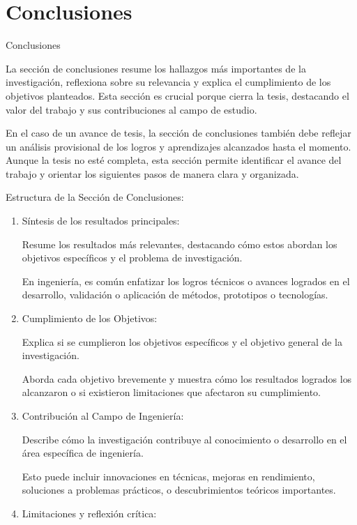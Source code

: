 \documentclass[9pt]{beamer}
\begin{document}
\section{Conclusiones}
\begin{frame}{Conclusiones}

La sección de conclusiones resume los hallazgos más importantes de la investigación, reflexiona sobre su relevancia y explica el cumplimiento de los objetivos planteados. Esta sección es crucial porque cierra la tesis, destacando el valor del trabajo y sus contribuciones al campo de estudio.

En el caso de un avance de tesis, la sección de conclusiones también debe reflejar un análisis provisional de los logros y aprendizajes alcanzados hasta el momento. Aunque la tesis no esté completa, esta sección permite identificar el avance del trabajo y orientar los siguientes pasos de manera clara y organizada.


Estructura de la Sección de Conclusiones:

\begin{enumerate}
    \item Síntesis de los resultados principales:

    Resume los resultados más relevantes, destacando cómo estos abordan los objetivos específicos y el problema de investigación.

    En ingeniería, es común enfatizar los logros técnicos o avances logrados en el desarrollo, validación o aplicación de métodos, prototipos o tecnologías.

    \item Cumplimiento de los Objetivos:

    Explica si se cumplieron los objetivos específicos y el objetivo general de la investigación.

    Aborda cada objetivo brevemente y muestra cómo los resultados logrados los alcanzaron o si existieron limitaciones que afectaron su cumplimiento.

    \item Contribución al Campo de Ingeniería:

    Describe cómo la investigación contribuye al conocimiento o desarrollo en el área específica de ingeniería.

    Esto puede incluir innovaciones en técnicas, mejoras en rendimiento, soluciones a problemas prácticos, o descubrimientos teóricos importantes.

    \item Limitaciones y reflexión crítica:


\end{enumerate}
\end{frame}
\end{document}
